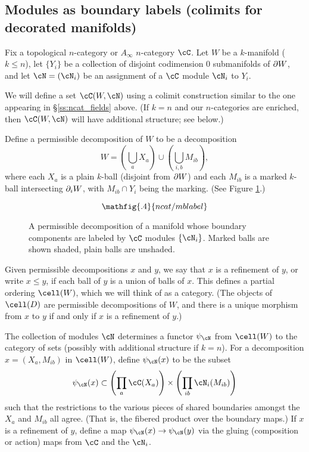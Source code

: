 \subsection{Modules as boundary labels (colimits for decorated manifolds)}
\label{moddecss}

Fix a topological $n$-category or $A_\infty$ $n$-category  $\cC$.
Let $W$ be a $k$-manifold ($k\le n$),
let $\{Y_i\}$ be a collection of disjoint codimension 0 submanifolds of $\partial W$,
and let $\cN = (\cN_i)$ be an assignment of a $\cC$ module $\cN_i$ to $Y_i$.


We will define a set $\cC(W, \cN)$ using a colimit construction similar to 
the one appearing in \S \ref{ss:ncat_fields} above.
(If $k = n$ and our $n$-categories are enriched, then
$\cC(W, \cN)$ will have additional structure; see below.)

Define a permissible decomposition of $W$ to be a decomposition
\[
	W = \left(\bigcup_a X_a\right) \cup \left(\bigcup_{i,b} M_{ib}\right) ,
\]
where each $X_a$ is a plain $k$-ball (disjoint from $\partial W$) and
each $M_{ib}$ is a marked $k$-ball intersecting $\partial_i W$,
with $M_{ib}\cap Y_i$ being the marking.
(See Figure \ref{mblabel}.)
\begin{figure}[!ht]\begin{equation*}
\mathfig{.4}{ncat/mblabel}
\end{equation*}\caption{A permissible decomposition of a manifold
whose boundary components are labeled by $\cC$ modules $\{\cN_i\}$.
Marked balls are shown shaded, plain balls are unshaded.}\label{mblabel}\end{figure}
Given permissible decompositions $x$ and $y$, we say that $x$ is a refinement
of $y$, or write $x \le y$, if each ball of $y$ is a union of balls of $x$.
This defines a partial ordering $\cell(W)$, which we will think of as a category.
(The objects of $\cell(D)$ are permissible decompositions of $W$, and there is a unique
morphism from $x$ to $y$ if and only if $x$ is a refinement of $y$.)

The collection of modules $\cN$ determines 
a functor $\psi_\cN$ from $\cell(W)$ to the category of sets 
(possibly with additional structure if $k=n$).
For a decomposition $x = (X_a, M_{ib})$ in $\cell(W)$, define $\psi_\cN(x)$ to be the subset
\[
	\psi_\cN(x) \sub \left(\prod_a \cC(X_a)\right) \times \left(\prod_{ib} \cN_i(M_{ib})\right)
\]
such that the restrictions to the various pieces of shared boundaries amongst the
$X_a$ and $M_{ib}$ all agree.
(That is, the fibered product over the boundary maps.)
If $x$ is a refinement of $y$, define a map $\psi_\cN(x)\to\psi_\cN(y)$
via the gluing (composition or action) maps from $\cC$ and the $\cN_i$.


